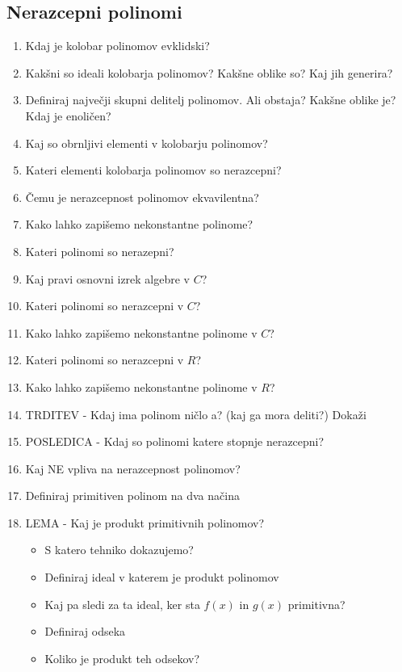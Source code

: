 \documentclass{article}
\begin{document}
    \subsection{Nerazcepni polinomi}
    \begin{enumerate}
        \item Kdaj je kolobar polinomov evklidski?
        \item Kakšni so ideali kolobarja polinomov? Kakšne oblike so? Kaj jih generira?
        \item Definiraj največji skupni delitelj polinomov. Ali obstaja? Kakšne oblike je? Kdaj je enoličen?
        \item Kaj so obrnljivi elementi v kolobarju polinomov?
        \item Kateri elementi kolobarja polinomov so nerazcepni?
        \item Čemu je nerazcepnost polinomov ekvavilentna?
        \item Kako lahko zapišemo nekonstantne polinome?
        \item Kateri polinomi so nerazepni?
        \item Kaj pravi osnovni izrek algebre v $C$?
        \item Kateri polinomi so nerazcepni v $C$?
        \item Kako lahko zapišemo nekonstantne polinome v $C$?
        \item Kateri polinomi so nerazcepni v $R$?
        \item Kako lahko zapišemo nekonstantne polinome v $R$?
        \item TRDITEV - Kdaj ima polinom ničlo a? (kaj ga mora deliti?) Dokaži
        \item POSLEDICA - Kdaj so polinomi katere stopnje nerazcepni? 
        \item Kaj NE vpliva na nerazcepnost polinomov?
        \item Definiraj primitiven polinom na dva načina
        \item LEMA - Kaj je produkt primitivnih polinomov?
        \begin{itemize}
            \item S katero tehniko dokazujemo?
            \item Definiraj ideal v katerem je produkt polinomov
            \item Kaj pa sledi za ta ideal, ker sta $f(x)$ in $g(x)$ primitivna?
            \item Definiraj odseka
            \item Koliko je produkt teh odsekov?

\end{itemize}
\end{enumerate}
\end{document}
